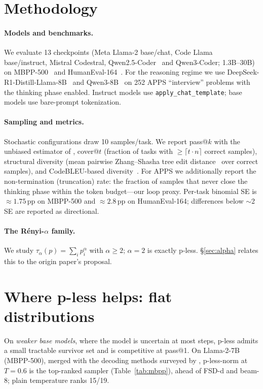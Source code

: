 \documentclass[11pt]{article}                       %
\newcommand{\tsum}{\ensuremath{\textstyle\sum}}
\begin{document}
\section{Methodology}\label{sec:method}
\paragraph{Models and benchmarks.} We evaluate 13 checkpoints (Meta Llama-2 base/chat, Code
Llama~\citep{roziere2023codellama} base/instruct, Mistral Codestral, Qwen2.5-Coder~\citep{hui2024qwen25coder}
and Qwen3-Coder; 1.3B--30B) on MBPP-500~\citep{austin2021mbpp} and HumanEval-164~\citep{chen2021humaneval}.
For the reasoning regime we use DeepSeek-R1-Distill-Llama-8B~\citep{deepseekai2025r1} and
Qwen3-8B~\citep{yang2025qwen3} on 252 APPS ``interview'' problems with the thinking phase enabled.
Instruct models use \texttt{apply\_chat\_template}; base models use bare-prompt tokenization.

\paragraph{Sampling and metrics.} Stochastic configurations draw 10 samples/task. We report pass@$k$
with the unbiased estimator of \citet{chen2021humaneval}, cover@$t$ (fraction of tasks with
$\ge\!\lceil t\cdot n\rceil$ correct samples), structural diversity (mean pairwise Zhang--Shasha tree
edit distance~\citep{zhang1989simple} over correct samples), and CodeBLEU-based
diversity~\citep{ren2020codebleu}. For APPS we additionally report the non-termination
(truncation) rate: the fraction of samples that never close the thinking phase within the token
budget---our loop proxy. Per-task binomial SE is $\approx 1.75$\,pp on MBPP-500 and $\approx 2.8$\,pp
on HumanEval-164; differences below $\sim$2\,SE are reported as directional.

\paragraph{The R\'enyi-$\alpha$ family.} We study $\tau_\alpha(p)=\tsum_i p_i^\alpha$ with
$\alpha \ge 2$; $\alpha=2$ is exactly p-less. \S\ref{sec:alpha} relates this to the origin paper's
proposal.

\section{Where p-less helps: flat distributions}\label{sec:helps}
On \emph{weaker base models}, where the model is uncertain at most steps, p-less admits a small
tractable survivor set and is competitive at pass@1. On Llama-2-7B (MBPP-500), merged with the
decoding methods surveyed by \citet{shi2024decoding}, p-less-norm at $T{=}0.6$ is the top-ranked
sampler (Table~\ref{tab:mbpp}), ahead of FSD-d and beam-8; plain temperature ranks 15/19.
\end{document}
